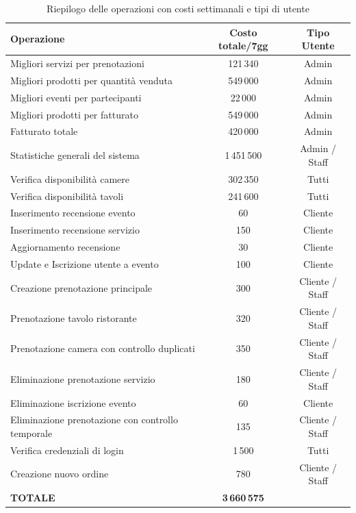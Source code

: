 \documentclass[a4paper,12pt]{report}
\begin{document}
\begin{table}[H]
  \centering
  \small
  \renewcommand{\arraystretch}{1.2}
  \begin{tabularx}{\textwidth}{|>{\raggedright\arraybackslash}X|c|c|}
    \hline
    \rowcolor{gray!20}
    \textbf{Operazione} & \textbf{Costo totale/7gg} & \textbf{Tipo Utente} \\
    \hline
    Migliori servizi per prenotazioni & 121\,340 & Admin \\
    \hline
    Migliori prodotti per quantità venduta & 549\,000 & Admin \\
    \hline
    Migliori eventi per partecipanti & 22\,000 & Admin \\
    \hline
    Migliori prodotti per fatturato & 549\,000 & Admin \\
    \hline
    Fatturato totale & 420\,000 & Admin \\
    \hline
    Statistiche generali del sistema & 1\,451\,500 & Admin / Staff \\
    \hline
    Verifica disponibilità camere & 302\,350 & Tutti \\
    \hline
    Verifica disponibilità tavoli & 241\,600 & Tutti \\
    \hline
    Inserimento recensione evento & 60 & Cliente \\
    \hline
    Inserimento recensione servizio & 150 & Cliente \\
    \hline
    Aggiornamento recensione & 30 & Cliente \\
    \hline
    Update e Iscrizione utente a evento & 100 & Cliente \\
    \hline
    Creazione prenotazione principale & 300 & Cliente / Staff \\
    \hline
    Prenotazione tavolo ristorante & 320 & Cliente / Staff \\
    \hline
    Prenotazione camera con controllo duplicati & 350 & Cliente / Staff \\
    \hline
    Eliminazione prenotazione servizio & 180 & Cliente / Staff \\
    \hline
    Eliminazione iscrizione evento & 60 & Cliente \\
    \hline
    Eliminazione prenotazione con controllo temporale & 135 & Cliente / Staff \\
    \hline
    Verifica credenziali di login & 1\,500 & Tutti \\
    \hline
    Creazione nuovo ordine & 780 & Cliente / Staff \\
    \hline
    \rowcolor{gray!20}
    \textbf{TOTALE} & \textbf{3\,660\,575} & \\
    \hline
  \end{tabularx}
  \caption{Riepilogo delle operazioni con costi settimanali e tipi di utente}
  \label{tab:riepilogo-operazioni}
\end{table}
\end{document}
